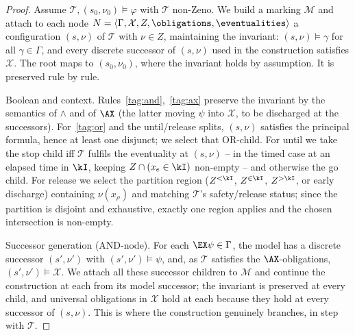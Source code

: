 \begin{proof}
Assume $\mathcal{T},(s_0,\nu_0)\models\varphi$ with $\mathcal{T}$ non-Zeno. We build a marking $\mathcal{M}$ and attach to each node $N=\langle\Gamma,\mathcal{X},Z,\obligations,\eventualities\rangle$ a configuration $(s,\nu)$ of $\mathcal{T}$ with $\nu\in Z$, maintaining the invariant: $(s,\nu)\models\gamma$ for all $\gamma\in\Gamma$, and every discrete successor of $(s,\nu)$ used in the construction satisfies $\mathcal{X}$. The root maps to $(s_0,\nu_0)$, where the invariant holds by assumption. It is preserved rule by rule.

{Boolean and context.} Rules~\eqref{tag:and},~\eqref{tag:ax} preserve the invariant by the semantics of $\land$ and of $\AX$ (the latter moving $\psi$ into $\mathcal{X}$, to be discharged at the successors). For~\eqref{tag:or} and the until/release splits, $(s,\nu)$ satisfies the principal formula, hence at least one disjunct; we select that OR-child. For until we take the stop child iff $\mathcal{T}$ fulfils the eventuality at $(s,\nu)$ -- in the timed case at an elapsed time in $\kI$, keeping $Z\cap(x_e\in\kI)$ non-empty -- and otherwise the go child. For release we select the partition region ($Z^{<\kI}$, $Z^{\in\kI}$, $Z^{>\kI}$, or early discharge) containing $\nu(x_\rho)$ and matching $\mathcal{T}$'s safety/release status; since the partition is disjoint and exhaustive, exactly one region applies and the chosen intersection is non-empty.

{Successor generation (AND-node).} For {each} $\EX\psi\in\Gamma$, the model has a discrete successor $(s',\nu')$ with $(s',\nu')\models\psi$, and, as $\mathcal{T}$ satisfies the $\AX$-obligations, $(s',\nu')\models\mathcal{X}$. We attach {all} these successor children to $\mathcal{M}$ and continue the construction at each from its model successor; the invariant is preserved at every child, and universal obligations in $\mathcal{X}$ hold at each because they hold at every successor of $(s,\nu)$. This is where the construction genuinely branches, in step with $\mathcal{T}$.


\end{proof}
